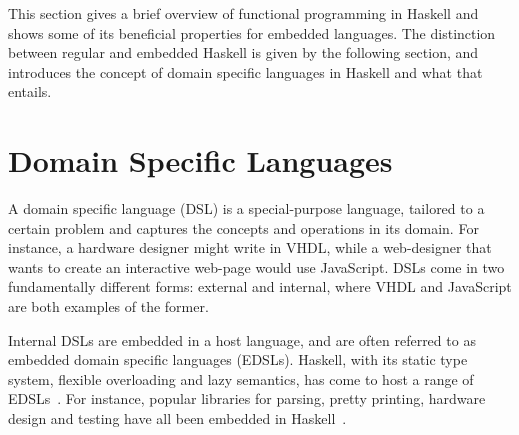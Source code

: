 \documentclass[../paper.tex]{subfiles}
\begin{document}

This section gives a brief overview of functional programming in Haskell and shows some of its beneficial properties for embedded languages. The distinction between regular and embedded Haskell is given by the following section, and introduces the concept of domain specific languages in Haskell and what that entails.


\section{Domain Specific Languages}
\label{domain}

A domain specific language (DSL) is a special-purpose language, tailored to a certain problem and captures the concepts and operations in its domain. For instance, a hardware designer might write in VHDL, while a web-designer that wants to create an interactive web-page would use JavaScript. DSLs come in two fundamentally different forms: external and internal, where VHDL and JavaScript are both examples of the former.



Internal DSLs are embedded in a host language, and are often referred to as embedded domain specific languages (EDSLs). Haskell, with its static type system, flexible overloading and lazy semantics, has come to host a range of EDSLs~\cite{elliott2003}. For instance, popular libraries for parsing, pretty printing, hardware design and testing have all been embedded in Haskell~\cite{leijen2002, hughes1995, bjesse1998}.
\end{document}
